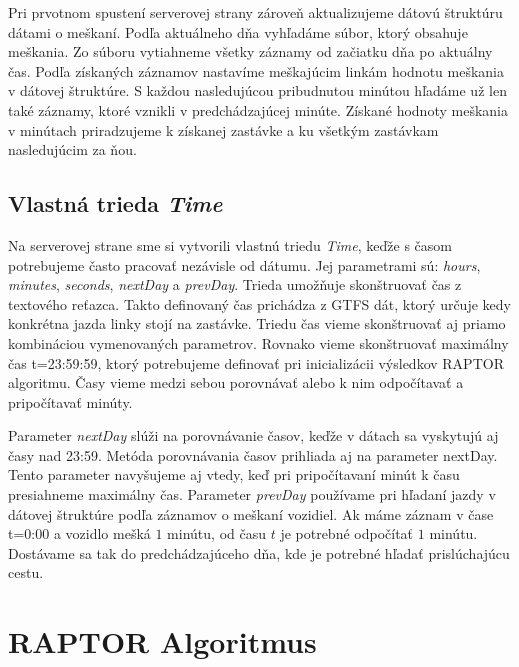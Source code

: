 Pri prvotnom spustení serverovej strany zároveň aktualizujeme dátovú štruktúru dátami o meškaní. Podľa aktuálneho dňa vyhľadáme súbor, ktorý obsahuje meškania. Zo súboru vytiahneme všetky záznamy od začiatku dňa po aktuálny čas. Podľa získaných záznamov nastavíme meškajúcim linkám hodnotu meškania v dátovej štruktúre. S každou nasledujúcou pribudnutou minútou hľadáme už len také záznamy, ktoré vznikli v predchádzajúcej minúte. 
Získané hodnoty meškania v minútach priradzujeme k získanej zastávke a ku všetkým zastávkam nasledujúcim za ňou. 

\subsection{Vlastná trieda \textit{Time}}
Na serverovej strane sme si vytvorili vlastnú triedu \textit{Time}, keďže s časom potrebujeme často pracovať nezávisle od dátumu. Jej parametrami sú: \textit{hours}, \textit{minutes}, \textit{seconds}, \textit{nextDay} a \textit{prevDay}. Trieda umožňuje skonštruovať čas z textového reťazca. Takto definovaný čas prichádza z GTFS dát, ktorý určuje kedy konkrétna jazda linky stojí na zastávke. Triedu čas vieme skonštruovať aj priamo kombináciou vymenovaných parametrov. Rovnako vieme skonštruovať maximálny čas t=23:59:59, ktorý potrebujeme definovať pri inicializácii výsledkov RAPTOR algoritmu. Časy vieme medzi sebou porovnávať alebo k nim odpočítavať a pripočítavať minúty.

Parameter \textit{nextDay} slúži na porovnávanie časov, keďže v dátach sa vyskytujú aj časy nad 23:59. Metóda porovnávania časov prihliada aj na parameter nextDay. Tento parameter navyšujeme aj vtedy, keď pri pripočítavaní minút k času presiahneme maximálny čas.
Parameter \textit{prevDay} používame pri hľadaní jazdy v dátovej štruktúre podľa záznamov o meškaní vozidiel. Ak  máme záznam v čase t=0:00 a vozidlo mešká $1$ minútu, od času $t$ je potrebné odpočítať $1$ minútu. Dostávame sa tak do predchádzajúceho dňa, kde je potrebné hľadať prislúchajúcu cestu. 

\section{RAPTOR Algoritmus}

